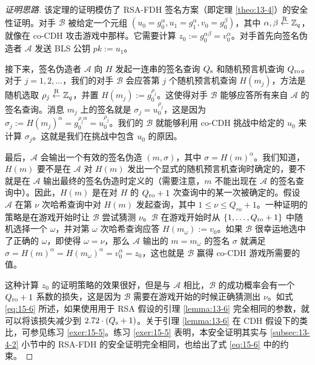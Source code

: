 \begin{proof}[证明思路]
该定理的证明模仿了 RSA-FDH 签名方案（即定理 \ref{theo:13-4}）的安全性证明。对手 $\mathcal{B}$ 被给定一个元组 $(u_0=g_0^\alpha, u_1=g_1^\alpha, v_0=g_0^\beta)$，其中 $\alpha,\beta\overset{\rm R}\leftarrow\mathbb{Z}_q$，就像在 co-CDH 攻击游戏中那样。它需要计算 $z_0:=g_0^{\alpha\beta}=v_0^\alpha$。对手首先向签名伪造者 $\mathcal{A}$ 发送 BLS 公钥 $pk:=u_1$。

接下来，签名伪造者 $\mathcal{A}$ 向 $H$ 发起一连串的签名查询 $Q_{\rm s}$ 和随机预言机查询 $Q_{\rm ro}$。对于 $j=1,2,\dots$，我们的对手 $\mathcal{B}$ 会应答第 $j$ 个随机预言机查询 $H(m_j)$，方法是随机选取 $\rho_j\overset{\rm R}\leftarrow\mathbb{Z}_q$，并置 $H(m_j):=g_0^{\rho_j}$。这使得对手 $\mathcal{B}$ 能够应答所有来自 $\mathcal{A}$ 的签名查询。消息 $m_j$ 上的签名就是 $\sigma_j=u_0^{\rho_j}$，这是因为 $\sigma_j:=H(m_j)^\alpha=g_0^{\rho_j\alpha}=u_0^{\rho_j}$。我们的 $\mathcal{B}$ 就能够利用 co-CDH 挑战中给定的 $u_0$ 来计算 $\sigma_j$。这就是我们在挑战中包含 $u_0$ 的原因。

最后，$\mathcal{A}$ 会输出一个有效的签名伪造 $(m,\sigma)$，其中 $\sigma=H(m)^\alpha$。我们知道，$H(m)$ 要不是在 $\mathcal{A}$ 对 $H(m)$ 发出一个显式的随机预言机查询时确定的，要不就是在 $\mathcal{A}$ 输出最终的签名伪造时定义的（需要注意，$m$ 不能出现在 $\mathcal{A}$ 的签名查询中）。因此，$H(m)$ 是在对 $H$ 的 $Q_{\rm ro}+1$ 次查询中的某一次被确定的。假设 $\mathcal{A}$ 在第 $\nu$ 次哈希查询中对 $H(m)$ 发起查询，其中 $1\leq\nu\leq Q_{ro}+1$。一种证明的策略是在游戏开始时让 $\mathcal{B}$ 尝试猜测 $\nu$。$\mathcal{B}$ 在游戏开始时从 $\{1,\dots,Q_{\rm ro}+1\}$ 中随机选择一个 $\omega$，并对第 $\omega$ 次哈希查询应答 $H(m_\omega):=v_0$。如果 $\mathcal{B}$ 很幸运地选中了正确的 $\omega$，即使得 $\omega=\nu$，那么 $\mathcal{A}$ 输出的 $m=m_\omega$ 的签名 $\sigma$ 就满足 $\sigma=H(m)^\alpha=H(m_\omega)^\alpha=v_0^\alpha=z_0$，这也就是 $\mathcal{B}$ 赢得 co-CDH 游戏所需要的值。

这种计算 $z_0$ 的证明策略的效果很好，但是与 $\mathcal{A}$ 相比，$\mathcal{B}$ 的成功概率会有一个 $Q_{\rm ro}+1$ 系数的损失，这是因为 $\mathcal{B}$ 需要在游戏开始的时候正确猜测出 $\nu$。如式 \ref{eq:15-6} 所述，如果使用用于 RSA 假设的引理 \ref{lemma:13-6} 完全相同的参数，就可以将该损失减少到 $2.72\cdot(Q_{\rm s}+1)$。关于引理 \ref{lemma:13-6} 在 CDH 假设下的类比，可参见练习 \ref{exer:15-5}。练习 \ref{exer:15-5} 表明，本安全证明其实与 \ref{subsec:13-4-2} 小节中的 RSA-FDH 的安全证明完全相同，也给出了式 \ref{eq:15-6} 中的约束。
\end{proof}

